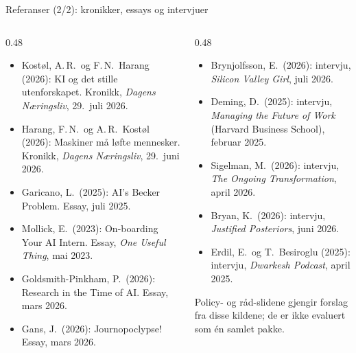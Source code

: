 \begin{frame}{Referanser (2/2): kronikker, essays og intervjuer}
\scriptsize
\begin{columns}[T,onlytextwidth]
\begin{column}{0.48\textwidth}
\begin{itemize}\setlength{\itemsep}{2pt}
  \item Kostøl, A.\,R.\ og F.\,N.\ Harang (2026): KI og det stille utenforskapet. Kronikk, \emph{Dagens Næringsliv}, 29.\ juli 2026.
  \item Harang, F.\,N.\ og A.\,R.\ Kostøl (2026): Maskiner må løfte mennesker. Kronikk, \emph{Dagens Næringsliv}, 29.\ juni 2026.
  \item Garicano, L.\ (2025): AI's Becker Problem. Essay, juli 2025.
  \item Mollick, E.\ (2023): On-boarding Your AI Intern. Essay, \emph{One Useful Thing}, mai 2023.
  \item Goldsmith-Pinkham, P.\ (2026): Research in the Time of AI. Essay, mars 2026.
  \item Gans, J.\ (2026): Journopoclypse! Essay, mars 2026.
\end{itemize}
\end{column}
\begin{column}{0.48\textwidth}
\begin{itemize}\setlength{\itemsep}{2pt}
  \item Brynjolfsson, E.\ (2026): intervju, \emph{Silicon Valley Girl}, juli 2026.
  \item Deming, D.\ (2025): intervju, \emph{Managing the Future of Work} (Harvard Business School), februar 2025.
  \item Sigelman, M.\ (2026): intervju, \emph{The Ongoing Transformation}, april 2026.
  \item Bryan, K.\ (2026): intervju, \emph{Justified Posteriors}, juni 2026.
  \item Erdil, E.\ og T.\ Besiroglu (2025): intervju, \emph{Dwarkesh Podcast}, april 2025.
\end{itemize}

\vspace{0.5em}
Policy- og råd-slidene gjengir forslag fra disse kildene; de er ikke evaluert som én samlet pakke.
\end{column}
\end{columns}
\end{frame}
